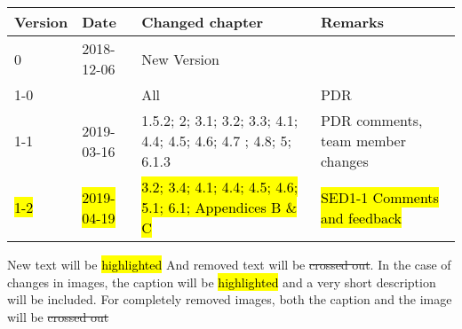 \begin{longtable}{|p{1.5cm}|p{2cm}|p{6cm}|p{3cm}|}\hline
\centering
\textbf{Version} & \textbf{Date} & \textbf{Changed chapter} & \textbf{Remarks}  \\\hline
0       & 2018-12-06 	& New Version 	&          				\\\hline
1-0   	&  				& All         	& PDR      				\\\hline

1-1		& 2019-03-16	& 1.5.2; 2; 3.1; 3.2; 3.3; 4.1; 4.4; 4.5; 4.6; 4.7 ; 4.8; 5; 6.1.3		& PDR comments, team member changes 			\\\hline
\hl{1-2}	& \hl{2019-04-19} &\hl{3.2; 3.4; 4.1; 4.4; 4.5; 4.6; 5.1; 6.1; Appendices B \& C} & \hl{SED1-1 Comments and feedback }\\\hline

\end{longtable}       

New text will be \hl{highlighted} And removed text will be \st{crossed out}. In the case of changes in images, the caption will be \hl{highlighted} and a very short description will be included. For completely removed images, both the caption and the image will be \st{crossed out} 